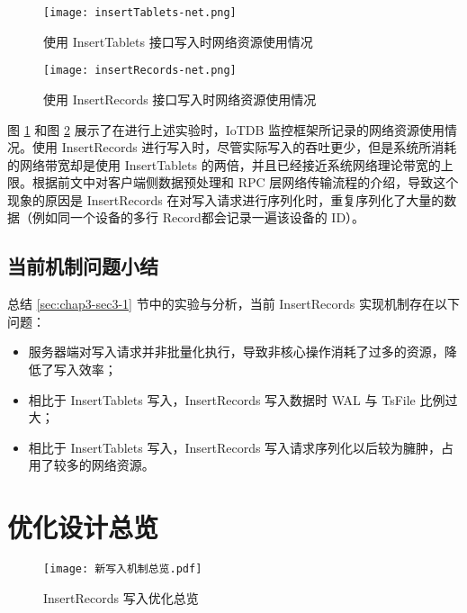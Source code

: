 \begin{figure}
  \centering
  \texttt{[image: insertTablets-net.png]}
  \caption{使用 InsertTablets 接口写入时网络资源使用情况}
  \label{fig:curr-insert-tablets-net}
\end{figure}

\begin{figure}
  \centering
  \texttt{[image: insertRecords-net.png]}
  \caption{使用 InsertRecords 接口写入时网络资源使用情况}
  \label{fig:curr-insert-records-net}
\end{figure}



图 \ref{fig:curr-insert-tablets-net} 和图 \ref{fig:curr-insert-records-net} 展示了在进行上述实验时，IoTDB 监控框架所记录的网络资源使用情况。使用 InsertRecords 进行写入时，尽管实际写入的吞吐更少，但是系统所消耗的网络带宽却是使用 InsertTablets 的两倍，并且已经接近系统网络理论带宽的上限。根据前文中对客户端侧数据预处理和 RPC 层网络传输流程的介绍，导致这个现象的原因是 InsertRecords 在对写入请求进行序列化时，重复序列化了大量的数据（例如同一个设备的多行 Record都会记录一遍该设备的 ID）。

\subsection{当前机制问题小结}
总结 \ref{sec:chap3-sec3-1} 节中的实验与分析，当前 InsertRecords 实现机制存在以下问题：
\begin{itemize}
  \item 服务器端对写入请求并非批量化执行，导致非核心操作消耗了过多的资源，降低了写入效率；
  \item 相比于 InsertTablets 写入，InsertRecords 写入数据时 WAL 与 TsFile 比例过大；
  \item 相比于 InsertTablets 写入，InsertRecords 写入请求序列化以后较为臃肿，占用了较多的网络资源。
\end{itemize}

\section{优化设计总览}
\begin{figure}
  \centering
  \texttt{[image: 新写入机制总览.pdf]}
  \caption{InsertRecords 写入优化总览}
  \label{fig:new-insert-records-overview}
\end{figure}

